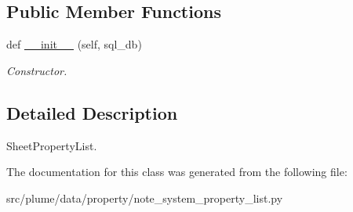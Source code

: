 \subsection*{Public Member Functions}
\begin{DoxyCompactItemize}
\item 
def \hyperlink{classplume-creator_1_1src_1_1plume_1_1data_1_1property_1_1note__system__property__list_1_1_note_system_property_list_ac6cfcffb6f84d41a63cf4be0fd399175}{\+\_\+\+\_\+init\+\_\+\+\_\+} (self, sql\+\_\+db)\hypertarget{classplume-creator_1_1src_1_1plume_1_1data_1_1property_1_1note__system__property__list_1_1_note_system_property_list_ac6cfcffb6f84d41a63cf4be0fd399175}{}\label{classplume-creator_1_1src_1_1plume_1_1data_1_1property_1_1note__system__property__list_1_1_note_system_property_list_ac6cfcffb6f84d41a63cf4be0fd399175}

\begin{DoxyCompactList}\small\item\em Constructor. \end{DoxyCompactList}\end{DoxyCompactItemize}


\subsection{Detailed Description}
Sheet\+Property\+List. 

The documentation for this class was generated from the following file\+:\begin{DoxyCompactItemize}
\item 
src/plume/data/property/note\+\_\+system\+\_\+property\+\_\+list.\+py\end{DoxyCompactItemize}
